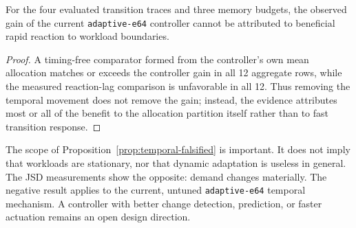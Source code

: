 \begin{proposition}
\label{prop:temporal-falsified}
For the four evaluated transition traces and three memory budgets, the observed gain of the current \texttt{adaptive-e64} controller cannot be attributed to beneficial rapid reaction to workload boundaries.
\end{proposition}

\begin{proof}
A timing-free comparator formed from the controller's own mean allocation matches or exceeds the controller gain in all 12 aggregate rows, while the measured reaction-lag comparison is unfavorable in all 12. Thus removing the temporal movement does not remove the gain; instead, the evidence attributes most or all of the benefit to the allocation partition itself rather than to fast transition response.
\end{proof}

The scope of Proposition~\ref{prop:temporal-falsified} is important. It does not imply that workloads are stationary, nor that dynamic adaptation is useless in general. The JSD measurements show the opposite: demand changes materially. The negative result applies to the current, untuned \texttt{adaptive-e64} temporal mechanism. A controller with better change detection, prediction, or faster actuation remains an open design direction.
